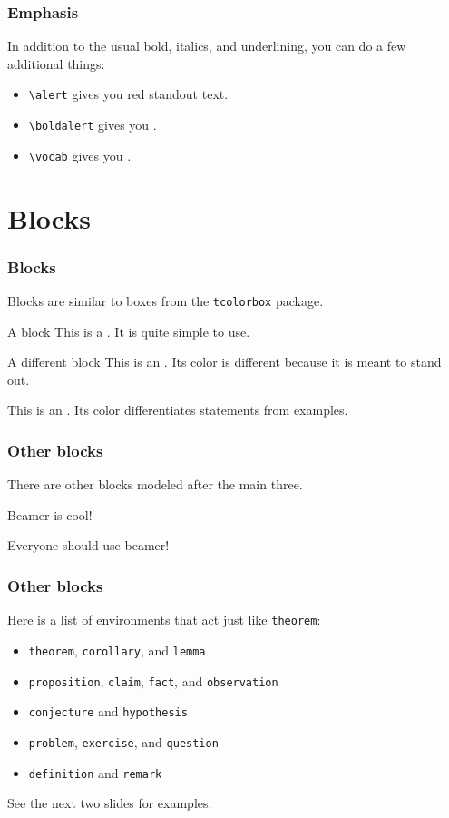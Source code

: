 \documentclass[mathserif]{beamer}
\begin{document}
\begin{frame}[fragile]\frametitle{Emphasis}
	In addition to the usual bold, italics, and underlining, you can do a few additional things:
	\pause
	\begin{itemize}[<+->]
		\item \verb|\alert| gives you \alert{red standout text}.
		\item \verb|\boldalert| gives you .
		\item \verb|\vocab| gives you .
	\end{itemize}
\end{frame}

\section{Blocks}

\begin{frame}\frametitle{Blocks}
	Blocks are similar to boxes from the \texttt{tcolorbox} package.
	\begin{block}{A block}
		This is a . It is quite simple to use.
	\end{block}
	\pause
	\begin{alertblock}{A different block}
		This is an . Its color is different because it is meant to stand out.
	\end{alertblock}
	\pause
	\begin{examples}
		This is an . Its color differentiates statements from examples.
	\end{examples}
\end{frame}

\begin{frame}\frametitle{Other blocks}
	There are other blocks modeled after the main three.
	\pause
	\begin{theorem}
		Beamer is cool!
	\end{theorem}
	\begin{corollary}[Wright, 2003]
		Everyone should use beamer!
	\end{corollary}
\end{frame}

\begin{frame}\frametitle{Other blocks}
	Here is a list of environments that act just like \texttt{theorem}:
	\begin{itemize}
		\item \texttt{theorem}, \texttt{corollary}, and \texttt{lemma}
		\item \texttt{proposition}, \texttt{claim}, \texttt{fact}, and \texttt{observation}
		\item \texttt{conjecture} and \texttt{hypothesis}
		\item \texttt{problem}, \texttt{exercise}, and \texttt{question}
		\item \texttt{definition} and \texttt{remark}
	\end{itemize}
	See the next two slides for examples.
\end{frame}
\end{document}
